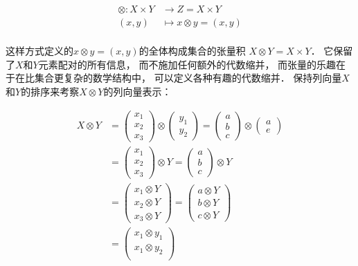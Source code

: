 \documentclass[10pt, openany]{book}
\begin{document}
$$
\begin{aligned}
\otimes: X \times Y &\to Z = X \times Y \\
(x,y) &\mapsto x \otimes y = (x,y) \\
\end{aligned}
$$

这样方式定义的$x \otimes y = (x,y)$的全体构成集合的张量积
$X \otimes Y = X \times Y$．
它保留了$X$和$Y$元素配对的所有信息，
而不施加任何额外的代数缩并，
而张量的乐趣在于在比集合更复杂的数学结构中，
可以定义各种有趣的代数缩并．
保持列向量$X$和$Y$的排序来考察$X \otimes Y$的列向量表示：

\begin{equation}
\begin{aligned}
X \otimes Y 
&=\begin{pmatrix}x_1 \\ x_2 \\ x_3\end{pmatrix} \otimes \begin{pmatrix}y_1 \\ y_2\end{pmatrix}
=\begin{pmatrix}a \\ b \\ c\end{pmatrix} \otimes \begin{pmatrix}a \\ e\end{pmatrix} \\
&=\begin{pmatrix}x_1 \\ x_2 \\ x_3\end{pmatrix} \otimes Y
=\begin{pmatrix}a \\ b \\ c\end{pmatrix} \otimes Y \\
&=\begin{pmatrix}x_1 \otimes Y \\ x_2 \otimes Y \\ x_3 \otimes Y\end{pmatrix}
=\begin{pmatrix}a \otimes Y \\ b \otimes Y \\ c \otimes Y\end{pmatrix} \\
&=\begin{pmatrix}x_1 \otimes y_1 \\x_1 \otimes y_2 \\

\end{pmatrix}
\end{aligned}
\end{equation}
\end{document}
